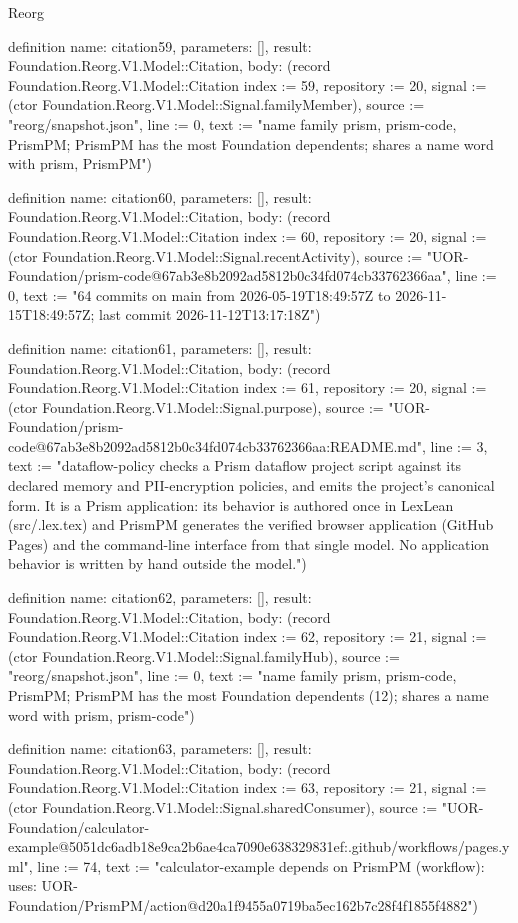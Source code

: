 \begin{lexlean}{Reorg}
\begin{semanticmodule}
definition{
  name: citation59,
  parameters: [],
  result: Foundation.Reorg.V1.Model::Citation,
  body: (record Foundation.Reorg.V1.Model::Citation {index := 59, repository := 20, signal := (ctor Foundation.Reorg.V1.Model::Signal.familyMember), source := "reorg/snapshot.json", line := 0, text := "name family {prism, prism-code, PrismPM}; PrismPM has the most Foundation dependents; shares a name word with prism, PrismPM"})
}

definition{
  name: citation60,
  parameters: [],
  result: Foundation.Reorg.V1.Model::Citation,
  body: (record Foundation.Reorg.V1.Model::Citation {index := 60, repository := 20, signal := (ctor Foundation.Reorg.V1.Model::Signal.recentActivity), source := "UOR-Foundation/prism-code@67ab3e8b2092ad5812b0c34fd074cb33762366aa", line := 0, text := "64 commits on main from 2026-05-19T18:49:57Z to 2026-11-15T18:49:57Z; last commit 2026-11-12T13:17:18Z"})
}

definition{
  name: citation61,
  parameters: [],
  result: Foundation.Reorg.V1.Model::Citation,
  body: (record Foundation.Reorg.V1.Model::Citation {index := 61, repository := 20, signal := (ctor Foundation.Reorg.V1.Model::Signal.purpose), source := "UOR-Foundation/prism-code@67ab3e8b2092ad5812b0c34fd074cb33762366aa:README.md", line := 3, text := "dataflow-policy checks a Prism dataflow project script against its declared memory and PII-encryption policies, and emits the project's canonical form. It is a Prism application: its behavior is authored once in LexLean (src/.lex.tex) and PrismPM generates the verified browser application (GitHub Pages) and the command-line interface from that single model. No application behavior is written by hand outside the model."})
}

definition{
  name: citation62,
  parameters: [],
  result: Foundation.Reorg.V1.Model::Citation,
  body: (record Foundation.Reorg.V1.Model::Citation {index := 62, repository := 21, signal := (ctor Foundation.Reorg.V1.Model::Signal.familyHub), source := "reorg/snapshot.json", line := 0, text := "name family {prism, prism-code, PrismPM}; PrismPM has the most Foundation dependents (12); shares a name word with prism, prism-code"})
}

definition{
  name: citation63,
  parameters: [],
  result: Foundation.Reorg.V1.Model::Citation,
  body: (record Foundation.Reorg.V1.Model::Citation {index := 63, repository := 21, signal := (ctor Foundation.Reorg.V1.Model::Signal.sharedConsumer), source := "UOR-Foundation/calculator-example@5051dc6adb18e9ca2b6ae4ca7090e638329831ef:.github/workflows/pages.yml", line := 74, text := "calculator-example depends on PrismPM (workflow): uses: UOR-Foundation/PrismPM/action@d20a1f9455a0719ba5ec162b7c28f4f1855f4882"})
}


\end{semanticmodule}
\end{lexlean}

